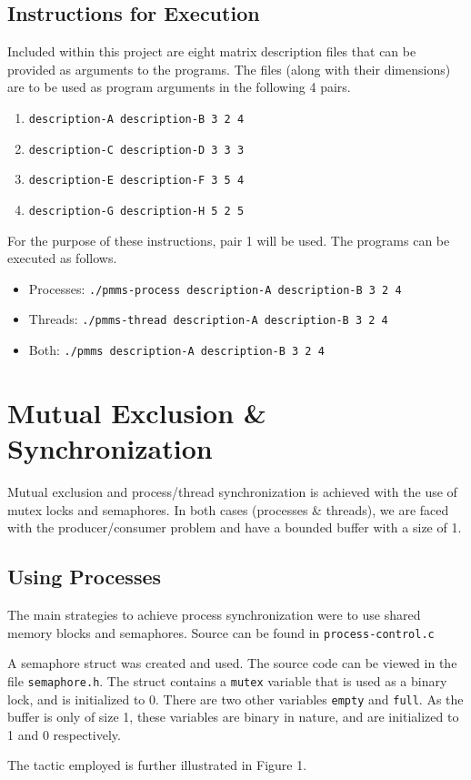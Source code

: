 \documentclass[titlepage]{article}
\begin{document}
\subsection{Instructions for Execution}
Included within this project are eight matrix description files that can be 
provided as arguments to the programs. The files (along with their 
dimensions) are to be used as program arguments in the following 4 pairs.
\begin{enumerate}
	\item \texttt{description-A description-B 3 2 4}
	\item \texttt{description-C description-D 3 3 3}
	\item \texttt{description-E description-F 3 5 4}
	\item \texttt{description-G description-H 5 2 5}
\end{enumerate}
For the purpose of these instructions, pair 1 will be used. The programs can be
executed as follows.
\begin{itemize}
	\item Processes: 
    	\texttt{./pmms-process description-A description-B 3 2 4}
    \item Threads: 
    	\hspace{6pt}\texttt{./pmms-thread description-A description-B 3 2 4}
    \item Both: 
    	\hspace{20pt}\texttt{./pmms description-A description-B 3 2 4}
\end{itemize}

\section{Mutual Exclusion \& Synchronization}

Mutual exclusion and process/thread synchronization is achieved with the use 
of mutex locks and semaphores. In both cases (processes \& threads), we are 
faced with the producer/consumer problem and have a bounded buffer with a 
size of 1.

\subsection{Using Processes}
The main strategies to achieve process synchronization were to use shared 
memory blocks and semaphores. Source can be found in \texttt{process-control.c}
\par
A semaphore struct was created and used. The source code can be viewed in 
the file \texttt{semaphore.h}. The struct contains a \texttt{mutex} 
variable that is used as a binary lock, and is initialized to 0. There are 
two other  variables \texttt{empty} and \texttt{full}. As the buffer is only 
of size 1, these variables are binary in nature, and are initialized to 1 and 
0 respectively. 
\par
The tactic employed is further illustrated in Figure 1.
\end{document}
